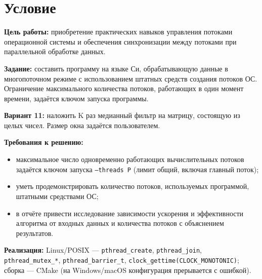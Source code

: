 \section{Условие}
{\bfseries Цель работы:} приобретение практических навыков управления потоками операционной
системы и обеспечения синхронизации между потоками при параллельной обработке данных.

{\bfseries Задание:} составить программу на языке Си, обрабатывающую данные в многопоточном
режиме с использованием штатных средств создания потоков ОС. Ограничение максимального
количества потоков, работающих в один момент времени, задаётся ключом запуска программы.

{\bfseries Вариант 11:} наложить K раз медианный фильтр на матрицу, состоящую из целых чисел.
Размер окна задаётся пользователем.

{\bfseries Требования к решению:}
\begin{itemize}
  \item максимальное число одновременно работающих вычислительных потоков задаётся ключом
    запуска \texttt{--threads P} (лимит общий, включая главный поток);
  \item уметь продемонстрировать количество потоков, используемых программой, штатными
    средствами ОС;
  \item в отчёте привести исследование зависимости ускорения и эффективности алгоритма от
    входных данных и количества потоков с объяснением результатов.
\end{itemize}

{\bfseries Реализация:} Linux/POSIX --- \texttt{pthread\_create}, \texttt{pthread\_join},
\texttt{pthread\_mutex\_*}, \texttt{pthread\_barrier\_t},
\texttt{clock\_gettime(CLOCK\_MONOTONIC)}; сборка --- CMake (на Windows/macOS конфигурация
прерывается с ошибкой).
